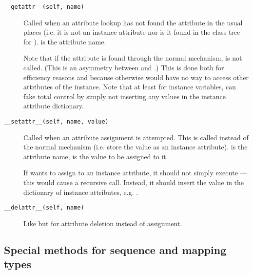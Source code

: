 \begin{description}

\item[\tt __getattr__(self, name)]
Called when an attribute lookup has not found the attribute in the
usual places (i.e. it is not an instance attribute nor is it found in
the class tree for ).   is the attribute name.

Note that if the attribute is found through the normal mechanism,
 is not called.  (This is an asymmetry between
 and .)
This is done both for efficiency reasons and because otherwise
 would have no way to access other attributes of the
instance.
Note that at least for instance variables,  can fake
total control by simply not inserting any values in the instance
attribute dictionary.

\item[\tt __setattr__(self, name, value)]
Called when an attribute assignment is attempted.  This is called
instead of the normal mechanism (i.e. store the value as an instance
attribute).   is the attribute name,  is the
value to be assigned to it.

If  wants to assign to an instance attribute, it
should not simply execute  --- this would
cause a recursive call.  Instead, it should insert the value in the
dictionary of instance attributes, e.g. .

\item[\tt __delattr__(self, name)]
Like  but for attribute deletion instead of
assignment.

\end{description}


\subsection{Special methods for sequence and mapping types}


